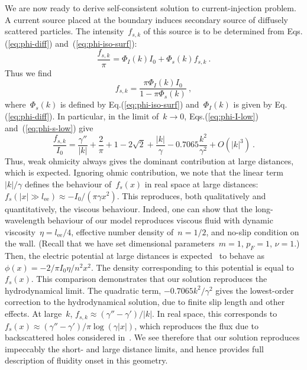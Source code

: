 \documentclass[preprint,aps,eqsecnum]{revtex4-1}
\begin{document}
We are now ready to derive self-consistent solution to current-injection
problem. A current source placed at the boundary induces secondary
source of diffusely scattered particles.
The intensity~$f_{s, k}$ of this source is to be determined from
Eqs.(\ref{eq:phi-diff}) and~(\ref{eq:phi-iso-surf}):
\begin{equation}
  \frac{f_{s, k}}{\pi} = \Phi_I(k) I_0 + \Phi_s(k) f_{s, k}
  \ .
\end{equation}
Thus we find
\begin{equation}
  f_{s, k} = \frac{\pi \Phi_I(k) I_0}{1 - \pi \Phi_s(k)}
  \ ,
\end{equation}
where~$\Phi_s(k)$ is defined by Eq.(\ref{eq:phi-iso-surf}) and~$\Phi_I(k)$
is given by Eq.(\ref{eq:phi-diff}). In particular, in the limit of~$k\to 0$,
Eqs.(\ref{eq:phi-I-low}) and~(\ref{eq:phi-s-low}) give 
\begin{equation}
  \label{eq:fs-k=0}
  \frac{f_{s, k}}{I_0}
  = \frac{\gamma''}{|k|} + \frac{2}{\pi} + 1 - 2 \sqrt{2} + \frac{|k|}{\gamma} - 0.7065 \frac{k^2}{\gamma^2} + O(|k|^3)
  \ . 
\end{equation}
Thus, weak ohmicity always gives the dominant contribution at large
distances, which is expected. Ignoring ohmic contribution, we 
note that the linear term~$|k|/\gamma$ defines the behaviour of~$f_s(x)$
in real space at large distances:
$f_s(|x| \gg l_\mathrm{ee}) \approx -I_0/(\pi \gamma x^2)$. This
reproduces, both qualitatively and quantitatively, the viscous
behaviour. Indeed, one can show that the long-wavelength behaviour
of our model reproduces viscous fluid with dynamic
viscosity~$\eta = l_\mathrm{ee}/4$, effective number density of~$n = 1/2$,
and no-slip condition on the wall. (Recall that we have set dimensional
parameters~$m = 1$, $p_F = 1$, $\nu = 1$.)
Then, the electric potential at large distances
is expected~\cite{bib:Levitov-Falkovich}
to behave as $\phi(x) = - 2/\pi I_0 \eta / n^2 x^2$. The density
corresponding to this potential is equal to~$f_s(x)$. This comparison
demonstrates that our solution reproduces the hydrodynamical limit.
The quadratic term, $-0.7065 k^2/\gamma^2$ gives the lowest-order
correction to the hydrodynamical solution, due to finite slip length
and other effects. 
At large~$k$, $f_{s, k} \approx (\gamma'' - \gamma') / |k|$.
In real space, this
corresponds to~$f_s(x) \approx  (\gamma'' - \gamma') / \pi \log(\gamma|x|)$,
which
reproduces the flux due to backscattered holes considered
in~\cite{bib:Shytov-et-al}. We see therefore that our solution reproduces
impeccably the short- and large distance limits, and hence provides
full description of fluidity onset in this geometry. 
\end{document}

